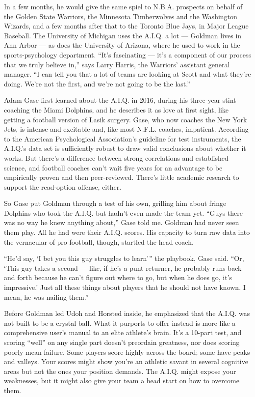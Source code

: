 In a few months, he would give the same spiel to N.B.A. prospects on
behalf of the Golden State Warriors, the Minnesota Timberwolves and the
Washington Wizards, and a few months after that to the Toronto Blue
Jays, in Major League Baseball. The University of Michigan uses the
A.I.Q. a lot --- Goldman lives in Ann Arbor --- as does the University
of Arizona, where he used to work in the sports-psychology department.
``It's fascinating --- it's a component of our process that we truly
believe in,'' says Larry Harris, the Warriors' assistant general
manager. ``I can tell you that a lot of teams are looking at Scott and
what they're doing. We're not the first, and we're not going to be the
last.''

Adam Gase first learned about the A.I.Q. in 2016, during his three-year
stint coaching the Miami Dolphins, and he describes it as love at first
sight, like getting a football version of Lasik surgery. Gase, who now
coaches the New York Jets, is intense and excitable and, like most
N.F.L. coaches, impatient. According to the American Psychological
Association's guideline for test instruments, the A.I.Q.'s data set is
sufficiently robust to draw valid conclusions about whether it works.
But there's a difference between strong correlations and established
science, and football coaches can't wait five years for an advantage to
be empirically proven and then peer-reviewed. There's little academic
research to support the read-option offense, either.

So Gase put Goldman through a test of his own, grilling him about fringe
Dolphins who took the A.I.Q. but hadn't even made the team yet. ``Guys
there was no way he knew anything about,'' Gase told me. Goldman had
never seen them play. All he had were their A.I.Q. scores. His capacity
to turn raw data into the vernacular of pro football, though, startled
the head coach.

``He'd say, `I bet you this guy struggles to learn''' the playbook, Gase
said. ``Or, `This guy takes a second --- like, if he's a punt returner,
he probably runs back and forth because he can't figure out where to go,
but when he does go, it's impressive.' Just all these things about
players that he should not have known. I mean, he was nailing them.''

Before Goldman led Udoh and Horsted inside, he emphasized that the
A.I.Q. was not built to be a crystal ball. What it purports to offer
instead is more like a comprehensive user's manual to an elite athlete's
brain. It's a 10-part test, and scoring ``well'' on any single part
doesn't preordain greatness, nor does scoring poorly mean failure. Some
players score highly across the board; some have peaks and valleys. Your
scores might show you're an athletic savant in several cognitive areas
but not the ones your position demands. The A.I.Q. might expose your
weaknesses, but it might also give your team a head start on how to
overcome them.

